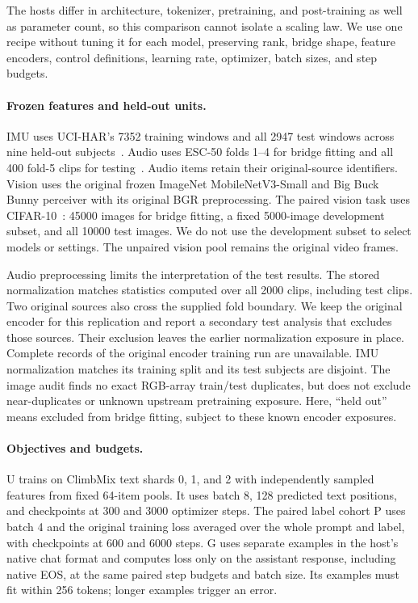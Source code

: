 \documentclass[11pt]{article}
\begin{document}


The hosts differ in architecture, tokenizer, pretraining, and post-training
as well as parameter count, so this comparison cannot isolate a scaling law.
We use one recipe without tuning it for each model, preserving rank, bridge shape, feature encoders,
control definitions, learning rate, optimizer, batch sizes, and step budgets.

\paragraph{Frozen features and held-out units.}
IMU uses UCI-HAR's 7352 training windows and all 2947 test windows across nine
held-out subjects~\cite{anguita2013uci}. Audio uses ESC-50 folds 1--4 for bridge
fitting and all 400 fold-5 clips for testing~\cite{piczak2015esc}. Audio items
retain their original-source identifiers. Vision uses the original frozen
ImageNet MobileNetV3-Small and Big Buck Bunny perceiver with its original BGR
preprocessing. The paired vision task uses CIFAR-10~\cite{krizhevsky2009cifar}:
45000 images for bridge fitting, a fixed 5000-image development subset, and all
10000 test images. We do not use the development subset to select models or
settings. The unpaired vision pool remains the original video frames.

Audio preprocessing limits the interpretation of the test results. The stored
normalization matches statistics computed over all 2000 clips, including test
clips. Two original sources also cross the supplied fold boundary. We keep the
original encoder for this replication and report a secondary test analysis
that excludes those sources. Their exclusion leaves the earlier normalization
exposure in place. Complete records of the original encoder training run are
unavailable. IMU normalization matches its training split and its test
subjects are disjoint. The image audit finds no exact RGB-array train/test
duplicates, but does not exclude near-duplicates or unknown upstream
pretraining exposure. Here, ``held out'' means excluded from bridge fitting,
subject to these known encoder exposures.

\paragraph{Objectives and budgets.}
U trains on ClimbMix text shards 0, 1, and 2 with independently sampled features
from fixed 64-item pools. It uses batch 8, 128 predicted text positions, and
checkpoints at 300 and 3000 optimizer steps. The paired label cohort P uses
batch 4 and the original training loss averaged over the whole prompt and label,
with checkpoints at 600 and 6000 steps. G uses separate examples in the host's
native chat format and computes loss only on the assistant response, including
native EOS, at the same paired step budgets and batch size.
Its examples must fit within 256 tokens; longer examples trigger an error.
\end{document}
